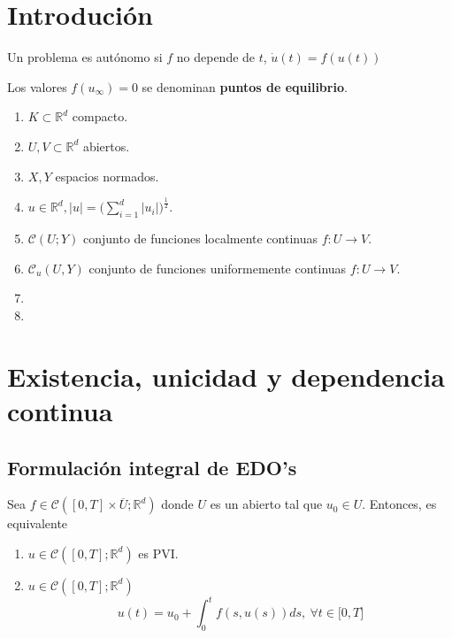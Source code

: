 \chapter{Introdución}

\begin{defn}
  Un problema es autónomo si $f$ no depende de $t$, $\dot{u}(t)=f(u(t))$ 
\end{defn}

\begin{defn}
  Los valores $f(u_{\infty}) = 0$ se denominan \textbf{puntos de equilibrio}.
\end{defn}

\begin{nota}
  \begin{enumerate}[label=(\roman*)]
    \item $K \subset \mathbb{R}^{d}$ compacto.
    \item $U,V \subset \mathbb{R}^{d}$ abiertos.
    \item $X,Y$ espacios normados.
    \item $u \in \mathbb{R}^{d}, |u| = \big ( \sum_{i=1}^{d} |u_{i}| \big )^{\frac{1}{2}}$.
    \item $\mathcal{C}( U; Y )$ conjunto de funciones localmente continuas $f: U \to V$.
    \item $\mathcal{C}_{u}( U, Y)$ conjunto de funciones uniformemente continuas $f: U \to V$.
    \item 
    \item 
  \end{enumerate}
\end{nota}

\chapter{Existencia, unicidad y dependencia continua}

\section{Formulación integral de EDO's}

\begin{theo}
  Sea $f \in \mathcal{C}([0,T]\times \overline{U};\mathbb{R}^d)$ donde $U$ es un abierto tal que $u_{0} \in U$. Entonces, es equivalente
  \begin{enumerate}[label=(\roman*)]
    \item $u \in \mathcal{C}([0,T];\mathbb{R}^d)$ es PVI.
    \item $u \in \mathcal{C}([0,T];\mathbb{R}^d)$ 
      \[ 
        u(t) = u_{0} + \int^{t}_{0} f(s, u(s)) ds, \ \forall t \in \big[ 0, T \big]
      \] 
      
  \end{enumerate}
\end{theo}

